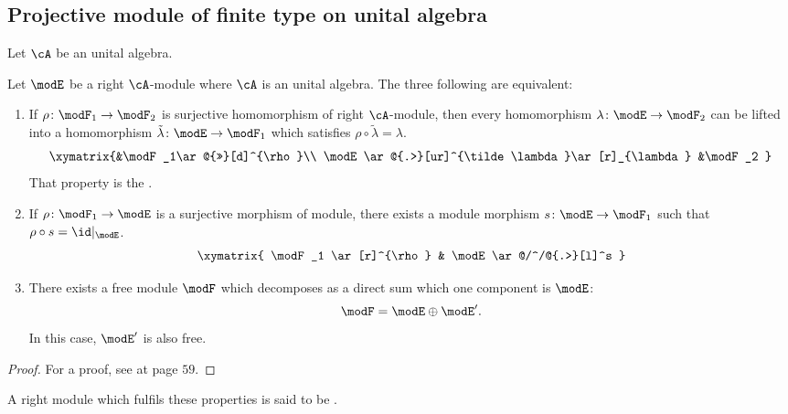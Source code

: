\subsection{Projective module of finite type on unital algebra}

Let $\cA$ be an unital algebra.

\begin{proposition}		\label{PropEquivProjModule}
	Let $\modE$ be a right $\cA$-module where $\cA$ is an unital algebra. The three following are equivalent:
	\begin{enumerate}
		\item If $\rho\colon \modF_1\to \modF_2$ is surjective homomorphism of right $\cA$-module, then every homomorphism $\lambda\colon \modE\to \modF_2$ can be lifted into a homomorphism $\tilde\lambda\colon \modE\to \modF_1$ which satisfies $\rho\circ\tilde\lambda=\lambda$.
		      \begin{equation}  \label{eq_diag_proj_mod}
			      \xymatrix{%
				      &\modF_1\ar@{>>}[d]^{\rho}\\
				      \modE \ar@{.>}[ur]^{\tilde\lambda}\ar[r]_{\lambda} &\modF_2
			      }
		      \end{equation}
		      That property is the .

		      \item\label{ItemTroisCarecterisationProjectif} If $\rho\colon\modF_1\to \modE$ is a surjective morphism of module, there exists a module morphism $s\colon \modE\to \modF_1$ such that $\rho\circ s=\id|_{\modE}$.
		      \[
			      \xymatrix{ \modF_1 \ar[r]^{\rho} & \modE \ar@/^/@{.>}[l]^s }
		      \]

		\item \label{prop_def_proj_module_iii}  There exists a free module $\modF$ which decomposes as a direct sum which one component is $\modE$:
		      \[
			      \modF=\modE\oplus\modE'.
		      \]
		      In this case, $\modE'$ is also free.

	\end{enumerate}
	\label{prop_def_proj_module}
\end{proposition}

\begin{proof}
	For a proof, see \cite{Landi} at page $59$.
\end{proof}

A right module which fulfils these properties is said to be .


